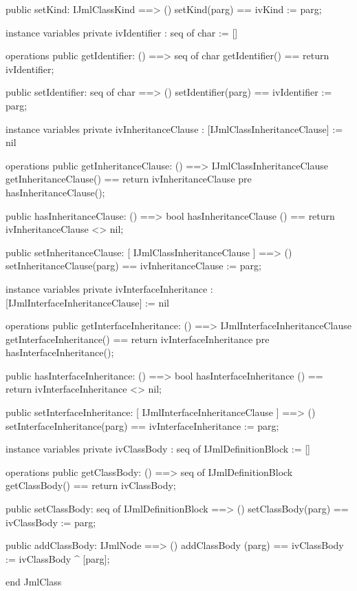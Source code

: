 \begin{vdm_al}
  public setKind: IJmlClassKind ==> ()
  setKind(parg) == ivKind := parg;

instance variables
  private ivIdentifier : seq of char := []

operations
  public getIdentifier: () ==> seq of char
  getIdentifier() == return ivIdentifier;

  public setIdentifier: seq of char ==> ()
  setIdentifier(parg) == ivIdentifier := parg;

instance variables
  private ivInheritanceClause : [IJmlClassInheritanceClause] := nil

operations
  public getInheritanceClause: () ==> IJmlClassInheritanceClause
  getInheritanceClause() == return ivInheritanceClause
    pre hasInheritanceClause();

  public hasInheritanceClause: () ==> bool
  hasInheritanceClause () == return ivInheritanceClause <> nil;

  public setInheritanceClause: [ IJmlClassInheritanceClause ] ==> ()
  setInheritanceClause(parg) == ivInheritanceClause := parg;

instance variables
  private ivInterfaceInheritance : [IJmlInterfaceInheritanceClause] := nil

operations
  public getInterfaceInheritance: () ==> IJmlInterfaceInheritanceClause
  getInterfaceInheritance() == return ivInterfaceInheritance
    pre hasInterfaceInheritance();

  public hasInterfaceInheritance: () ==> bool
  hasInterfaceInheritance () == return ivInterfaceInheritance <> nil;

  public setInterfaceInheritance: [ IJmlInterfaceInheritanceClause ] ==> ()
  setInterfaceInheritance(parg) == ivInterfaceInheritance := parg;

instance variables
  private ivClassBody : seq of IJmlDefinitionBlock := []

operations
  public getClassBody: () ==> seq of IJmlDefinitionBlock
  getClassBody() == return ivClassBody;

  public setClassBody: seq of IJmlDefinitionBlock ==> ()
  setClassBody(parg) == ivClassBody := parg;

  public addClassBody: IJmlNode ==> ()
  addClassBody (parg) == ivClassBody := ivClassBody ^ [parg];

end JmlClass
\end{vdm_al}

